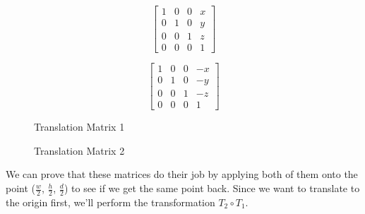 \documentclass[14pt]{article}
\begin{document}
\begin{figure}[H]
	\begin{center}
		\begin{minipage}[b]{0.45\textwidth}
			\centering	
			$$
			\begin{bmatrix}
			1 & 0 & 0 & x \\
			0 & 1 & 0 & y \\ 
			0 & 0 & 1 & z \\
			0 & 0 & 0 & 1
			\end{bmatrix}			
			$$
		\end{minipage}
		\hfill
		\begin{minipage}[b]{0.45\textwidth}
			\centering
			$$
			\begin{bmatrix}
			1 & 0 & 0 & -x \\
			0 & 1 & 0 & -y \\ 
			0 & 0 & 1 & -z \\
			0 & 0 & 0 & 1
			\end{bmatrix}			
			$$
		\end{minipage}
	\end{center}
	\begin{center}
		\begin{minipage}[t]{0.45\textwidth}
			\caption*{Translation Matrix 1}
		\end{minipage}
		\hfill
		\begin{minipage}[t]{0.45\textwidth}
			\caption*{Translation Matrix 2}
		\end{minipage}
	\end{center}
\end{figure}

\vspace*{-7mm}

We can prove that these matrices do their job by applying both of them onto the point ($\frac{w}{2}$, $\frac{h}{2}$, $\frac{d}{2}$) to see if we get the same point back. Since we want to translate to the origin first, we'll perform the transformation $T_2 \circ T_1$.

\vspace*{1em}
\end{document}
